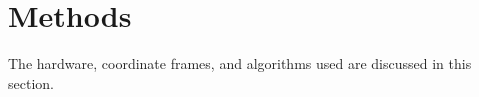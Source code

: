 \section{ Methods }

The hardware, coordinate frames, and algorithms used are discussed in this section.





% 

